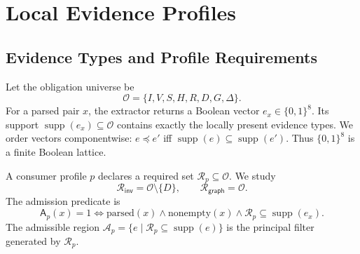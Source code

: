 \documentclass[10pt,conference]{IEEEtran}
\newcommand{\Oblig}{\mathcal{O}}
\newcommand{\Req}{\mathcal{R}}
\newcommand{\Adm}{\mathcal{A}}
\newcommand{\supp}{\operatorname{supp}}
\newcommand{\admit}{\mathsf{A}}
\newcommand{\inv}{\mathsf{inv}}
\newcommand{\graph}{\mathsf{graph}}
\begin{document}
\section{Local Evidence Profiles}
\subsection{Evidence Types and Profile Requirements}
Let the obligation universe be
\begin{equation}
\Oblig=\{I,V,S,H,R,D,G,\Delta\}.
\end{equation}
For a parsed pair $x$, the extractor returns a Boolean vector $e_x\in\{0,1\}^8$. Its support $\supp(e_x)\subseteq\Oblig$ contains exactly the locally present evidence types. We order vectors componentwise: $e\preceq e'$ iff $\supp(e)\subseteq\supp(e')$. Thus $\{0,1\}^8$ is a finite Boolean lattice.

A consumer profile $p$ declares a required set $\Req_p\subseteq\Oblig$. We study
\begin{equation}
\Req_{\inv}=\Oblig\setminus\{D\},\qquad \Req_{\graph}=\Oblig.
\end{equation}
The admission predicate is
\begin{equation}
\admit_p(x)=1 \Longleftrightarrow \mathrm{parsed}(x)\land\mathrm{nonempty}(x)\land \Req_p\subseteq\supp(e_x).
\label{eq:admission}
\end{equation}
The admissible region $\Adm_p=\{e\mid\Req_p\subseteq\supp(e)\}$ is the principal filter generated by $\Req_p$.
\end{document}
